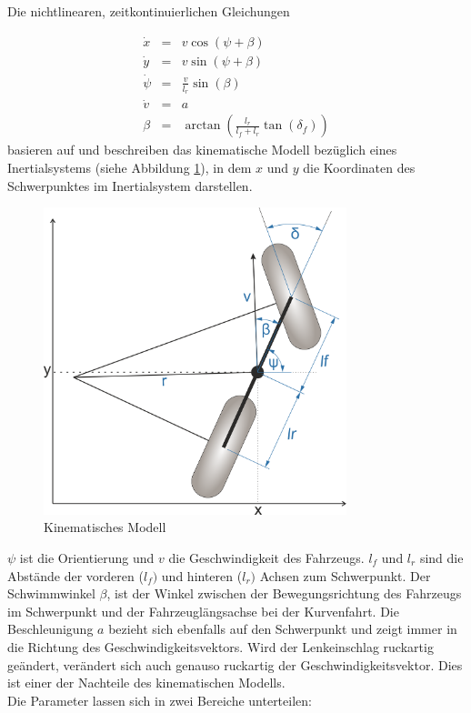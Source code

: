 \documentclass{like}
\begin{document}
\newpage
Die nichtlinearen, zeitkontinuierlichen Gleichungen 

\begin{eqnarray}
\label{eq:kinDiscrete}
\dot{x}   &= &v  \cos(\psi + \beta)\\
\dot{y}   &= &v  \sin(\psi + \beta)\\
\dot{\psi} &= &\frac{v}{l_r} \sin(\beta) \\
\dot{v}    &= &a \\
\beta      &= &\arctan \left( \frac{l_r}{l_f + l_r} \tan(\delta_f) \right) \label{compute_beta}
\end{eqnarray}
basieren auf \cite{rajamani2011vehicle, 7225830} und beschreiben das kinematische Modell bezüglich eines Inertialsystems (siehe Abbildung \ref{fig:kinmodel}), in dem \(x\) und \(y\) die Koordinaten des Schwerpunktes im Inertialsystem darstellen.
\\
\begin{figure}[ht!]
	\centering
	\includegraphics[width=250pt]{Abbildungen/kinBicycle.png}
	\caption{Kinematisches Modell}
	\label{fig:kinmodel}
\end{figure}
 
\(\psi\) ist die Orientierung und \(v\) die Geschwindigkeit des Fahrzeugs. \(l_f\) und \(l_r\) sind die Abstände der vorderen (\(l_f)\) und hinteren (\(l_r)\) Achsen zum Schwerpunkt.
Der Schwimmwinkel \(\beta\), ist der Winkel  zwischen der Bewegungsrichtung des Fahrzeugs im Schwerpunkt und der Fahrzeuglängsachse bei der Kurvenfahrt. Die Beschleunigung \(a\) bezieht sich ebenfalls auf den Schwerpunkt und zeigt immer in die Richtung des Geschwindigkeitsvektors. Wird der Lenkeinschlag ruckartig geändert, verändert sich auch genauso ruckartig der Geschwindigkeitsvektor. Dies ist einer der Nachteile des kinematischen Modells.\\
Die Parameter lassen sich in zwei Bereiche unterteilen:
\end{document}
